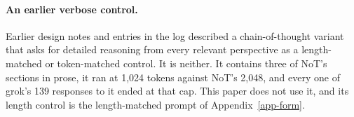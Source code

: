 \paragraph{An earlier verbose control.}
Earlier design notes and entries in the log described a chain-of-thought
variant that asks for detailed
reasoning from every relevant perspective as a length-matched or token-matched
control. It is neither. It contains three of NoT's sections in prose, it ran
at 1,024 tokens against NoT's 2,048, and every one of grok's 139 responses to
it ended at that cap. This paper does not use it, and its length control is
the length-matched prompt of Appendix~\ref{app-form}.

